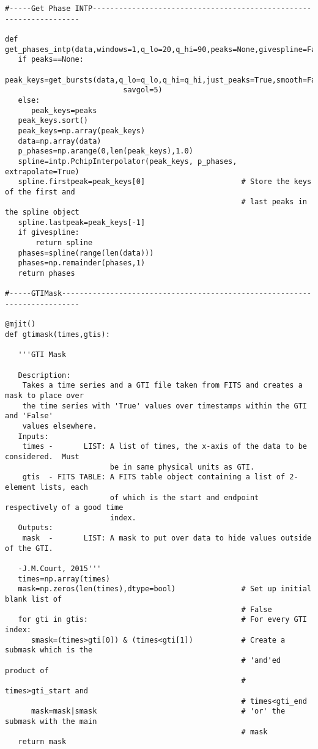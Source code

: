 \begin{verbatim}
#-----Get Phase INTP-------------------------------------------------------------------

def get_phases_intp(data,windows=1,q_lo=20,q_hi=90,peaks=None,givespline=False):
   if peaks==None:
      peak_keys=get_bursts(data,q_lo=q_lo,q_hi=q_hi,just_peaks=True,smooth=False,
                           savgol=5)
   else:
      peak_keys=peaks
   peak_keys.sort()
   peak_keys=np.array(peak_keys)
   data=np.array(data)
   p_phases=np.arange(0,len(peak_keys),1.0)
   spline=intp.PchipInterpolator(peak_keys, p_phases, extrapolate=True)
   spline.firstpeak=peak_keys[0]                      # Store the keys of the first and
                                                      # last peaks in the spline object
   spline.lastpeak=peak_keys[-1]
   if givespline:
       return spline
   phases=spline(range(len(data)))
   phases=np.remainder(phases,1)
   return phases

#-----GTIMask--------------------------------------------------------------------------

@mjit()
def gtimask(times,gtis):

   '''GTI Mask

   Description:
    Takes a time series and a GTI file taken from FITS and creates a mask to place over
    the time series with 'True' values over timestamps within the GTI and 'False'
    values elsewhere.
   Inputs:
    times -       LIST: A list of times, the x-axis of the data to be considered.  Must
                        be in same physical units as GTI.
    gtis  - FITS TABLE: A FITS table object containing a list of 2-element lists, each
                        of which is the start and endpoint respectively of a good time
                        index.
   Outputs:
    mask  -       LIST: A mask to put over data to hide values outside of the GTI.

   -J.M.Court, 2015'''
   times=np.array(times)
   mask=np.zeros(len(times),dtype=bool)               # Set up initial blank list of
                                                      # False
   for gti in gtis:                                   # For every GTI index:
      smask=(times>gti[0]) & (times<gti[1])           # Create a submask which is the 
                                                      # 'and'ed product of
                                                      # times>gti_start and
                                                      # times<gti_end
      mask=mask|smask                                 # 'or' the submask with the main
                                                      # mask
   return mask


\end{verbatim}
